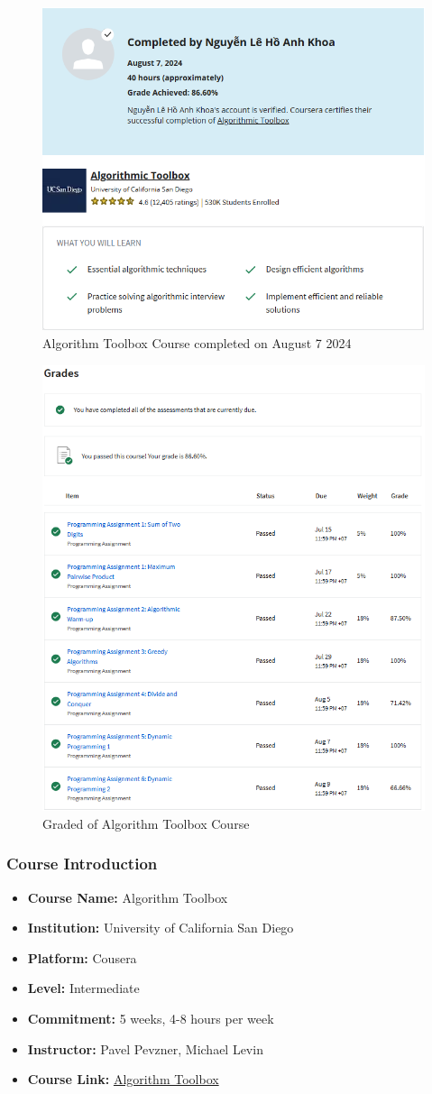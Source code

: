 \begin{figure}[H]
	\centering
	\includegraphics[width=0.7\linewidth]{img/Capture02.PNG}
	\caption{Algorithm Toolbox Course completed on August 7 2024}
	\label{fig:algorithmtoolbox}
\end{figure}

\begin{figure}[H]
	\centering
	\includegraphics[width=0.7\linewidth]{img/Capture06.PNG}
	\caption{Graded of Algorithm Toolbox Course}
	\label{fig:algorithmtoolbox}
\end{figure}

\subsubsection{Course Introduction}
\begin{itemize}
	\item \textbf{Course Name:} Algorithm Toolbox
	\item \textbf{Institution:} University of California San Diego
	\item \textbf{Platform:} Cousera
	\item \textbf{Level: } Intermediate
	\item \textbf{Commitment:} 5 weeks, 4-8 hours per week
	\item \textbf{Instructor:} Pavel Pevzner, Michael Levin
	\item \textbf{Course Link:} \href{https://www.coursera.org/learn/algorithmic-toolbox}{Algorithm Toolbox}
\end{itemize}

